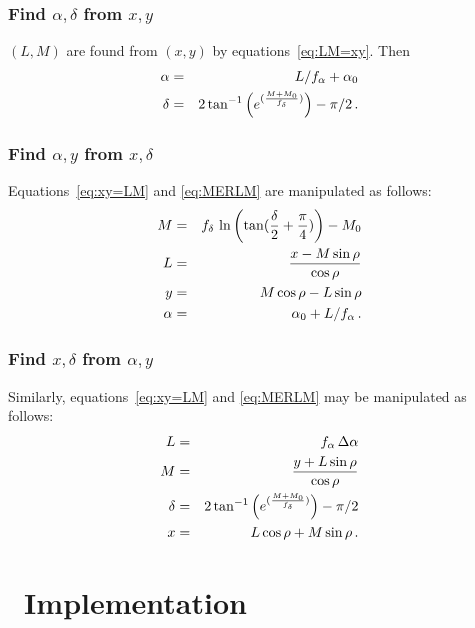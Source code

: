 \subsubsection{Find $\alpha,\delta$ from $x,y$}

     $(L,M)$ are found from $(x,y)$ by equations~\ref{eq:LM=xy}.  Then
\begin{eqnarray*}
   \alpha & = & L/f_{\alpha} + \alpha_0 \\
   \delta & = & 2 \tan^{-1}\left(e^{(\frac{M+M_0}{f_{\delta}})}\right) -
                   \pi/2\, .
\end{eqnarray*}

\subsubsection{Find $\alpha,y$ from $x,\delta$}

     Equations~\ref{eq:xy=LM} and \ref{eq:MERLM} are manipulated as
follows:
\begin{eqnarray*}
   M & = &f_{\delta}\,\ln\left(\tan(\frac{\delta}{2} + \frac{\pi}{4})\right)
            - M_0 \\
   L & = &\frac{x - M\sin\rho}{\cos\rho} \\
   y & = &M\cos\rho - L\sin\rho \\
   \alpha & = &\alpha_0 + L/f_{\alpha} \, .
\end{eqnarray*}

\subsubsection{Find $x,\delta$ from $\alpha,y$}

     Similarly, equations~\ref{eq:xy=LM} and \ref{eq:MERLM} may be
manipulated as follows:
\begin{eqnarray*}
   L      & = &f_{\alpha}\,\Delta\alpha \\
   M      & = &\frac{y + L\sin\rho}{\cos\rho} \\
   \delta & = &2 \tan^{-1}\left(e^{(\frac{M+M_0}{f_{\delta}})}\right)-\pi/2 \\
   x      & = & L\cos\rho + M\sin\rho \, .
\end{eqnarray*}

\section{\AIPS\ Implementation}

